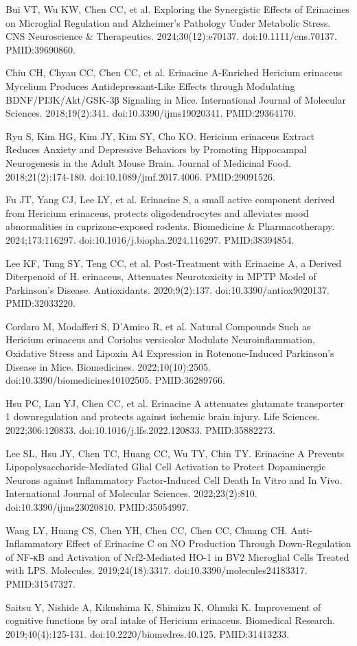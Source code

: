 \documentclass[11pt,oneside]{book}
\newcommand{\reff}[2]{\par\hangindent=7mm\hangafter=1\noindent[#1]\hspace{2mm}#2\par}
\begin{document}
\reff{31}{Bui VT, Wu KW, Chen CC, et al. Exploring the Synergistic Effects of Erinacines on Microglial Regulation and Alzheimer's Pathology Under Metabolic Stress. CNS Neuroscience \& Therapeutics. 2024;30(12):e70137. doi:10.1111/cns.70137. PMID:39690860.}
\reff{32}{Chiu CH, Chyau CC, Chen CC, et al. Erinacine A-Enriched Hericium erinaceus Mycelium Produces Antidepressant-Like Effects through Modulating BDNF/PI3K/Akt/GSK-3β Signaling in Mice. International Journal of Molecular Sciences. 2018;19(2):341. doi:10.3390/ijms19020341. PMID:29364170.}
\reff{33}{Ryu S, Kim HG, Kim JY, Kim SY, Cho KO. Hericium erinaceus Extract Reduces Anxiety and Depressive Behaviors by Promoting Hippocampal Neurogenesis in the Adult Mouse Brain. Journal of Medicinal Food. 2018;21(2):174-180. doi:10.1089/jmf.2017.4006. PMID:29091526.}
\reff{34}{Fu JT, Yang CJ, Lee LY, et al. Erinacine S, a small active component derived from Hericium erinaceus, protects oligodendrocytes and alleviates mood abnormalities in cuprizone-exposed rodents. Biomedicine \& Pharmacotherapy. 2024;173:116297. doi:10.1016/j.biopha.2024.116297. PMID:38394854.}
\reff{35}{Lee KF, Tung SY, Teng CC, et al. Post-Treatment with Erinacine A, a Derived Diterpenoid of H. erinaceus, Attenuates Neurotoxicity in MPTP Model of Parkinson's Disease. Antioxidants. 2020;9(2):137. doi:10.3390/antiox9020137. PMID:32033220.}
\reff{36}{Cordaro M, Modafferi S, D'Amico R, et al. Natural Compounds Such as Hericium erinaceus and Coriolus versicolor Modulate Neuroinflammation, Oxidative Stress and Lipoxin A4 Expression in Rotenone-Induced Parkinson's Disease in Mice. Biomedicines. 2022;10(10):2505. doi:10.3390/biomedicines10102505. PMID:36289766.}
\reff{37}{Hsu PC, Lan YJ, Chen CC, et al. Erinacine A attenuates glutamate transporter 1 downregulation and protects against ischemic brain injury. Life Sciences. 2022;306:120833. doi:10.1016/j.lfs.2022.120833. PMID:35882273.}
\reff{38}{Lee SL, Hsu JY, Chen TC, Huang CC, Wu TY, Chin TY. Erinacine A Prevents Lipopolysaccharide-Mediated Glial Cell Activation to Protect Dopaminergic Neurons against Inflammatory Factor-Induced Cell Death In Vitro and In Vivo. International Journal of Molecular Sciences. 2022;23(2):810. doi:10.3390/ijms23020810. PMID:35054997.}
\reff{39}{Wang LY, Huang CS, Chen YH, Chen CC, Chen CC, Chuang CH. Anti-Inflammatory Effect of Erinacine C on NO Production Through Down-Regulation of NF-κB and Activation of Nrf2-Mediated HO-1 in BV2 Microglial Cells Treated with LPS. Molecules. 2019;24(18):3317. doi:10.3390/molecules24183317. PMID:31547327.}
\reff{40}{Saitsu Y, Nishide A, Kikushima K, Shimizu K, Ohnuki K. Improvement of cognitive functions by oral intake of Hericium erinaceus. Biomedical Research. 2019;40(4):125-131. doi:10.2220/biomedres.40.125. PMID:31413233.}
\end{document}
